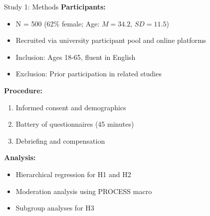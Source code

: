 \documentclass[aspectratio=169,12pt]{beamer}
\begin{document}
\begin{frame}{Study 1: Methods}
  \textbf{Participants:}
  \begin{itemize}
    \item N = 500 (62\% female; Age: $M = 34.2$, $SD = 11.5$)
    \item Recruited via university participant pool and online platforms
    \item Inclusion: Ages 18-65, fluent in English
    \item Exclusion: Prior participation in related studies
  \end{itemize}
  
  \vspace{0.5cm}
  
  \textbf{Procedure:}
  \begin{enumerate}
    \item Informed consent and demographics
    \item Battery of questionnaires (45 minutes)
    \item Debriefing and compensation
  \end{enumerate}
  
  \vspace{0.5cm}
  
  \textbf{Analysis:}
  \begin{itemize}
    \item Hierarchical regression for H1 and H2
    \item Moderation analysis using PROCESS macro
    \item Subgroup analyses for H3
  \end{itemize}
\end{frame}
\end{document}
